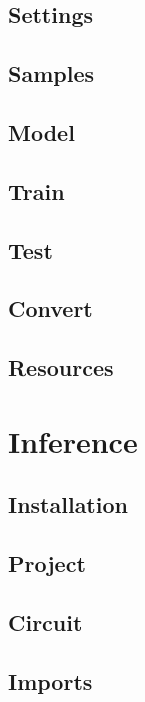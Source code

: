 \documentclass[aspectratio=169]{beamer}
\begin{document}
\subsection{Settings}

\subsection{Samples}

\subsection{Model}

\subsection{Train}

\subsection{Test}

\subsection{Convert}

\subsection{Resources}


\section{Inference}
\subsection{Installation}

\subsection{Project}

\subsection{Circuit}

\subsection{Imports}

\end{document}
